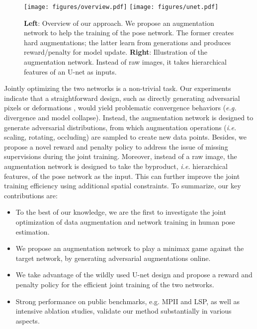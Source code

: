 \documentclass[10pt,twocolumn,letterpaper]{article}
\begin{document}
\begin{figure*}[t!]
    \centering
  \texttt{[image: figures/overview.pdf]}
\endminipage
{}
    \centering
  \texttt{[image: figures/unet.pdf]}
\endminipage
\caption{{\bf Left}: Overview of our approach. We propose an augmentation network to help the training of the pose network. The former creates hard augmentations; the latter learn from generations and produces reward/penalty for model update. {\bf Right}: Illustration of the augmentation network. Instead of raw images, it takes hierarchical features of an U-net as inputs.}
\label{fig:overview}
\end{figure*}

Jointly optimizing the two networks is a non-trivial task. Our experiments indicate that a straightforward design, such as directly generating adversarial pixels \cite{goodfellow2014gan, reed2016generative} or deformations \cite{wang2017fast, jaderberg2015spatial}, would yield problematic convergence behaviors ({\it e.g.} divergence and model collapse). Instead, the augmentation network is designed to generate adversarial distributions, from which augmentation operations ({\it i.e.} scaling, rotating, occluding) are sampled to create new data points. Besides, we propose a novel reward and penalty policy to address the issue of missing supervisions during the joint training. Moreover, instead of a raw image, the augmentation network is designed to take the byproduct, {\it i.e.} hierarchical features, of the pose network as the input. This can further improve the joint training efficiency using additional spatial constraints. To summarize, our key contributions are:

\begin{itemize}
    \item To the best of our knowledge, we are the first to investigate the joint optimization of data augmentation and network training in human pose estimation.
    
    \item We propose an augmentation network to play a minimax game against the target network, by generating adversarial augmentations online.
    
    \item We take advantage of the wildly used U-net design and propose a reward and penalty policy for the efficient joint training of the two networks.
    
    \item Strong performance on public benchmarks, {e.g.} MPII and LSP, as well as intensive ablation studies, validate our method substantially in various aspects.
\end{itemize}
\end{document}
